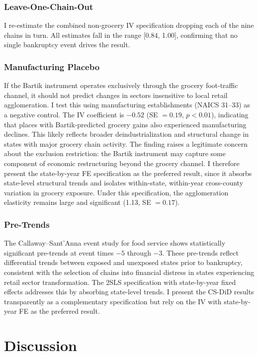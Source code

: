 \documentclass[12pt]{article}
\begin{document}
\subsubsection*{Leave-One-Chain-Out} I re-estimate the combined non-grocery IV specification dropping each of the nine chains in turn. All estimates fall in the range [0.84, 1.00], confirming that no single bankruptcy event drives the result.

\subsubsection*{Manufacturing Placebo} If the Bartik instrument operates exclusively through the grocery foot-traffic channel, it should not predict changes in sectors insensitive to local retail agglomeration. I test this using manufacturing establishments (NAICS 31--33) as a negative control. The IV coefficient is $-0.52$ (SE $= 0.19$, $p < 0.01$), indicating that places with Bartik-predicted grocery gains also experienced manufacturing declines. This likely reflects broader deindustrialization and structural change in states with major grocery chain activity. The finding raises a legitimate concern about the exclusion restriction: the Bartik instrument may capture some component of economic restructuring beyond the grocery channel. I therefore present the state-by-year FE specification as the preferred result, since it absorbs state-level structural trends and isolates within-state, within-year cross-county variation in grocery exposure. Under this specification, the agglomeration elasticity remains large and significant (1.13, SE $= 0.17$).

\subsubsection*{Pre-Trends} The Callaway--Sant'Anna event study for food service shows statistically significant pre-trends at event times $-5$ through $-3$. These pre-trends reflect differential trends between exposed and unexposed states prior to bankruptcy, consistent with the selection of chains into financial distress in states experiencing retail sector transformation. The 2SLS specification with state-by-year fixed effects addresses this by absorbing state-level trends. I present the CS-DiD results transparently as a complementary specification but rely on the IV with state-by-year FE as the preferred result.


\section{Discussion}
\label{sec:discussion}
\end{document}
